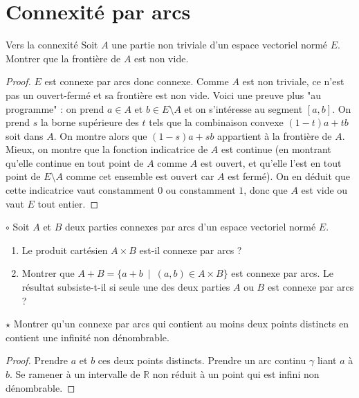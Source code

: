 \documentclass[french,a4paper]{article}
\newcommand{\R}{\mathbb{R}}
\theoremstyle{plain}
\theoremstyle{definition}
\theoremstyle{remark}
\begin{document}
\section{Connexité par arcs}

\begin{ex}{Vers la connexité}
	Soit $A$ une partie non triviale d'un espace vectoriel normé $E$. Montrer que la frontière de $A$ est non vide.
\end{ex}
\begin{proof}
	$E$ est connexe par arcs donc connexe. Comme $A$ est non triviale, ce n'est pas un ouvert-fermé et sa frontière est non vide. Voici une preuve plus "au programme" : on prend $a\in A$ et $b\in E\setminus A$ et on s'intéresse au segment $[a,b]$. On prend $s$ la borne supérieure des $t$ tels que la combinaison convexe $(1-t)a+tb$ soit dans $A$. On montre alors que $(1-s)a+sb$ appartient à la frontière de $A$. Mieux, on montre que la fonction indicatrice de $A$ est continue (en montrant qu'elle continue en tout point de $A$ comme $A$ est ouvert, et qu'elle l'est en tout point de $E\setminus A$ comme cet ensemble est ouvert car $A$ est fermé). On en déduit que cette indicatrice vaut constamment $0$ ou constamment $1$, donc que $A$ est vide ou vaut $E$ tout entier.
\end{proof}

\begin{ex}{$\circ$}
	Soit $A$ et $B$ deux parties connexes par arcs d'un espace vectoriel normé $E$.
	\begin{enumerate}
		\item Le produit cartésien $A\times B$ est-il connexe par arcs ?
		\item Montrer que $A+B=\{a+b\ \mid\ (a,b)\in A\times B\}$ est connexe par arcs. Le résultat subsiste-t-il si seule une des deux parties $A$ ou $B$ est connexe par arcs ?
	\end{enumerate}
\end{ex}

\begin{ex}{$\star$}
	Montrer qu'un connexe par arcs qui contient au moins deux points distincts en contient une infinité non dénombrable.
\end{ex}
\begin{proof}
	Prendre $a$ et $b$ ces deux points distincts. Prendre un arc continu $\gamma$ liant $a$ à $b$. Se ramener à un intervalle de $\R$ non réduit à un point qui est infini non dénombrable.
\end{proof}
\end{document}
